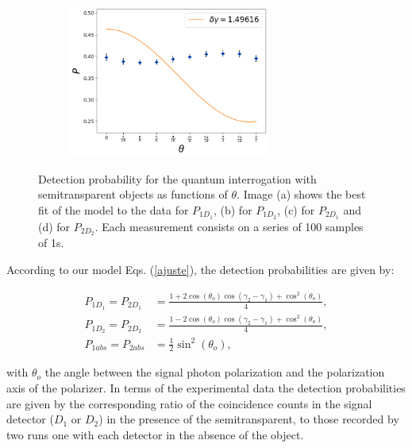 \documentclass[12pt]{book}
\begin{document}
\begin{figure}[t!]
\begin{subfigure}[b]{0.45\linewidth}
\caption{}
\end{subfigure}
\begin{subfigure}[b]{0.45\linewidth}
\includegraphics[width=\linewidth,height=5cm]{images/ajuste_miercoles_22.png}
\caption{}
\end{subfigure}
\caption{Detection probability for the quantum interrogation with semitransparent objects as functions of $\theta$. Image (a) shows the best fit of the model to the data for $P_{1D_{1}}$, (b) for $P_{1D_{2}}$, (c) for $P_{2D_{1}}$ and (d) for $P_{2D_{2}}$. Each measurement consists on a series of 100 samples of 1s.}
\label{ajustes}
\end{figure}

According to our model Eqs. (\ref{ajuste}), the detection probabilities are given by:

\begin{align*}
  P_{1D_{1}}=P_{2D_{1}}&=\frac{1+2\cos(\theta_{o})\cos(\gamma_{2}-\gamma_{1})+\cos^{2}(\theta_{o})}{4},\\
  P_{1D_{2}}=P_{2D_{2}}&=\frac{1-2\cos(\theta_{o})\cos(\gamma_{2}-\gamma_{1})+\cos^{2}(\theta_{o})}{4},\\
  P_{1abs}=P_{2abs}&=\frac{1}{2}\sin^{2}(\theta_{o}),
\end{align*}

with $\theta_{o}$ the angle between the signal photon polarization and the polarization axis of the polarizer. In terms of the experimental data the detection probabilities are given by the corresponding ratio of the coincidence counts in the signal detector ($D_{1}$ or $D_{2}$) in the presence of the semitransparent, to those recorded by two runs one with each detector in the absence of the object.
\end{document}
